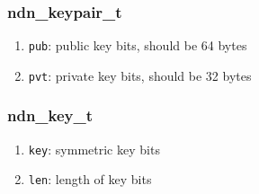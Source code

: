 \documentclass[a4paper, 11pt]{article}
\begin{document}
        \subsubsection*{ndn\_keypair\_t}
        \begin{enumerate}
                \item \texttt{pub}: public key bits, should be 64 bytes
                \item \texttt{pvt}: private key bits, should be 32 bytes
        \end{enumerate} 

        \subsubsection*{ndn\_key\_t}
        \begin{enumerate}
                \item \texttt{key}: symmetric key bits
                \item \texttt{len}: length of key bits
        \end{enumerate} 
        
        
        
\end{document}
